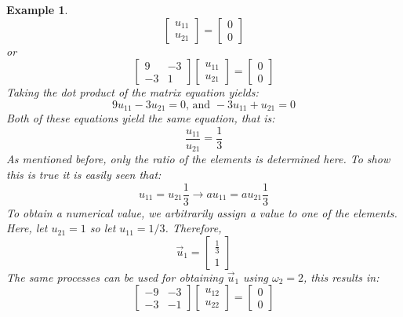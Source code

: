 \documentclass[12pt,letter]{article}
\newtheorem{ex}{Example}
\numberwithin{ex}{section} %
\newenvironment{example}{\begin{mdframed}[middlelinewidth=0.5mm]\begin{ex}\normalfont}{\end{ex}\end{mdframed}}
\numberwithin{re}{section} %
\begin{document}
\begin{example}
\begin{equation}
	 \begin{bmatrix} u_{11}\\ u_{21}\end{bmatrix}=\begin{bmatrix} 0\\ 0\end{bmatrix}
\end{equation}
or
\begin{equation}
	 \begin{bmatrix} 9 & -3 \\    -3  & 1 \end{bmatrix} 
	 \begin{bmatrix} u_{11}\\ u_{21}\end{bmatrix}=\begin{bmatrix} 0\\ 0\end{bmatrix}
\end{equation}
Taking the dot product of the matrix equation yields:
\begin{equation}
	9u_{11} -3u_{21}=0 \text{, and } -3u_{11} + u_{21}=0
\end{equation}
Both of these equations yield the same equation, that is:
\begin{equation}
	\frac{u_{11}}{u_{21}} =\frac{1}{3}
\end{equation}
As mentioned before, only the ratio of the elements is determined here. To show this is true it is easily seen that:
\begin{equation}
	u_{11}=u_{21}\frac{1}{3} \rightarrow  a u_{11}= a u_{21}\frac{1}{3} 
\end{equation}
To obtain a numerical value, we arbitrarily assign a value to one of the elements. Here, let $u_{21}=1$ so  let $u_{11}=1/3$. Therefore, 
\begin{equation}
	 \vec{u}_1 = \begin{bmatrix} \frac{1}{3}\\ 1\end{bmatrix}
\end{equation}
The same processes can be used for obtaining $\vec{u}_1$ using $\omega_2=2$, this results in:
\begin{equation}
	 \begin{bmatrix} -9 & -3 \\    -3  & -1 \end{bmatrix} 
	 \begin{bmatrix} u_{12}\\ u_{22}\end{bmatrix}=\begin{bmatrix} 0\\ 0\end{bmatrix}

\end{equation}
\end{example}
\end{document}
